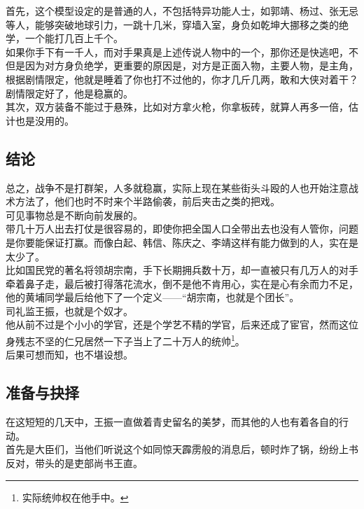 \begin{multicols}{\theparacolNo}
首先，这个模型设定的是普通的人，不包括特异功能人士，如郭靖、杨过、张无忌等人，能够突破地球引力，一跳十几米，穿墙入室，身负如乾坤大挪移之类的绝学，一个能打几百上千个。\\

如果你手下有一千人，而对手果真是上述传说人物中的一个，那你还是快逃吧，不但是因为对方身负绝学，更重要的原因是，对方是正面入物，主要人物，是主角，根据剧情限定，他就是睡着了你也打不过他的，你才几斤几两，敢和大侠对着干？剧情限定好了，他是稳赢的。\\

其次，双方装备不能过于悬殊，比如对方拿火枪，你拿板砖，就算人再多一倍，估计也是没用的。\\

\subsection{结论}
总之，战争不是打群架，人多就稳赢，实际上现在某些街头斗殴的人也开始注意战术方法了，他们也时不时来个半路偷袭，前后夹击之类的把戏。\\

可见事物总是不断向前发展的。\\

带几十万人出去打仗是很容易的，即使你把全国人口全带出去也没有人管你，问题是你要能保证打赢。而像白起、韩信、陈庆之、李靖这样有能力做到的人，实在是太少了。\\

比如国民党的著名将领胡宗南，手下长期拥兵数十万，却一直被只有几万人的对手牵着鼻子走，最后被打得落花流水，倒不是他不肯用心，实在是心有余而力不足，他的黄埔同学最后给他下了一个定义——“胡宗南，也就是个团长”。\\

司礼监王振，也就是个奴才。\\

他从前不过是个小小的学官，还是个学艺不精的学官，后来还成了宦官，然而这位身残志不坚的仁兄居然一下子当上了二十万人的统帅\footnote{实际统帅权在他手中。}。\\

后果可想而知，也不堪设想。\\

\subsection{准备与抉择}
在这短短的几天中，王振一直做着青史留名的美梦，而其他的人也有着各自的行动。\\

首先是大臣们，当他们听说这个如同惊天霹雳般的消息后，顿时炸了锅，纷纷上书反对，带头的是吏部尚书王直。\\


\end{multicols}
